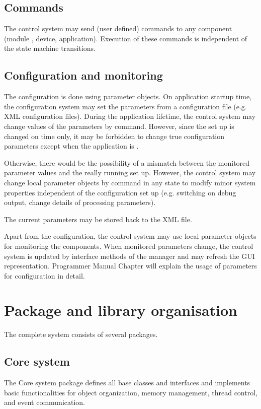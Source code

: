 \subsection{Commands}
The control system may send (user defined) commands to any 
   component (module , device, application). Execution of these commands is 
   independent of the state machine transitions.

\subsection{Configuration and monitoring}
The configuration is done using parameter objects.
On application startup time, the configuration system may 
set the parameters from a configuration file (e.g. XML configuration files). 
During the application lifetime, the control system may change 
values of the parameters by command. However, since the set 
up is changed on  time only, it may be forbidden to change 
true configuration parameters except when the application is . 

Otherwise, there would be the possibility of a mismatch between the 
monitored parameter values and the really running set up.
However, the control system may change local parameter objects 
by command in any state to modify minor system properties 
independent of the configuration set up (e.g. switching on 
debug output, change details of processing parameters).
      
The current parameters  may be stored back to the XML file.
      
Apart from the configuration, 
the control system may use local parameter objects for 
monitoring the components. When monitored parameters change, 
the control system is updated by interface methods of the 
manager and may refresh the GUI representation.
Programmer Manual Chapter  will explain the usage of parameters for configuration
in detail. 


\section{Package and library organisation}
The complete system consists of several packages. 

 
\subsection{Core system}
The Core system package defines all base classes and interfaces
and implements basic functionalities for object organization, memory management, 
thread control, and event communication. 
   
